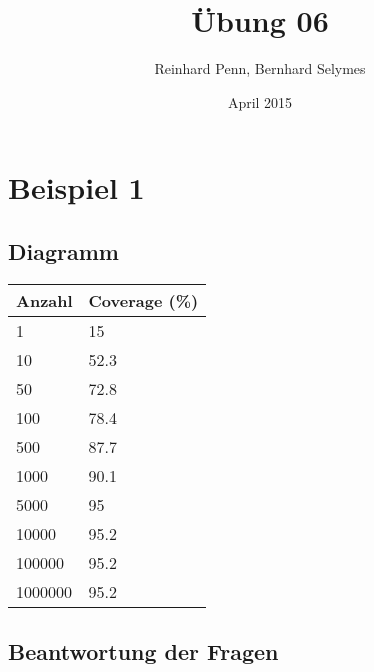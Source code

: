\documentclass[12pt,a4paper]{article}
\begin{document}
\title{Übung 06}
\author{Reinhard Penn, Bernhard Selymes}
\date{April 2015}

\normalsize


\newcommand{\Uebung}{Random}
\newcommand{\srcpath}{../../src}
\newcommand{\simpath}{../../sim}



\section{Beispiel 1}

\subsection{Diagramm}

\begin{table}[H]
\begin{tabular}{|l|l|}
\hline
Anzahl  & Coverage (\%) \\ \hline
1       & 15   \\ \hline
10      & 52.3 \\ \hline
50      & 72.8 \\ \hline
100     & 78.4 \\ \hline
500     & 87.7 \\ \hline
1000    & 90.1 \\ \hline
5000    & 95   \\ \hline
10000   & 95.2 \\ \hline
100000  & 95.2 \\ \hline
1000000 & 95.2 \\ \hline
\end{tabular}
\end{table}

\subsection{Beantwortung der Fragen}
\end{document}
